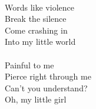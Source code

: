 \\
Words like violence \\
Break the silence \\
Come crashing in \\
Into my little world \\
\\
Painful to me \\
Pierce right through me \\
Can't you understand? \\
Oh, my little girl \\